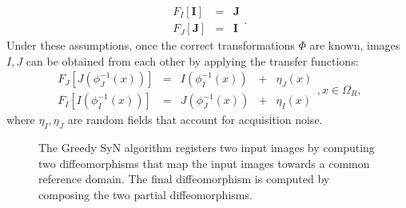 \begin{equation}\label{eq:intensity_transfers}
    \begin{array}{ccccc}
        F_{I}\left[\mathbf{I}\right] &=& \mathbf{J}\\
        F_{J}\left[\mathbf{J}\right] &=& \mathbf{I}
    \end{array}.
\end{equation}
Under these assumptions, once the correct transformations $\Phi$ are known, images $I, J$ can be obtained from each other by applying the transfer functions:
\begin{equation}\label{eq:SyNEM_gom_ref}
    \begin{array}{ccccc}
        F_{J}\left[J(\phi_{J}^{-1}(x))\right] &=& I(\phi_{I}^{-1}(x)) &+& \eta_{J}(x)\\
        F_{I}\left[I(\phi_{I}^{-1}(x))\right] &=& J(\phi_{J}^{-1}(x)) &+& \eta_{I}(x)
    \end{array}, x\in\Omega_{R},
\end{equation}
where $\eta_{I}, \eta_{J}$ are random fields that account for acquisition noise.\\

\begin{figure}[t!]
\centering
{}
\caption{The Greedy SyN algorithm registers two input images by computing two diffeomorphisms that map the input images towards a common reference domain. The final
diffeomorphism is computed by composing the two partial diffeomorphisms.}
\label{fig:syn_overview}
\end{figure}

